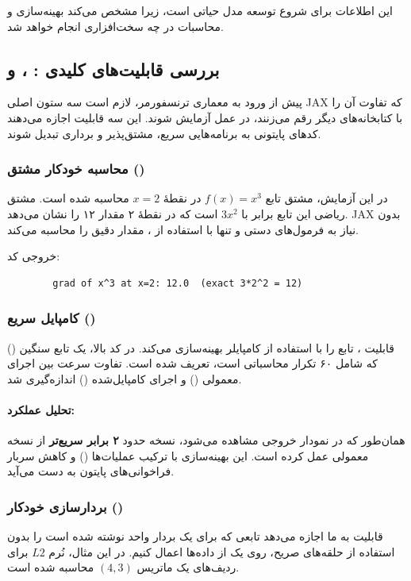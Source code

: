\documentclass{article}
\begin{document}
این اطلاعات برای شروع توسعه مدل حیاتی است، زیرا مشخص می‌کند بهینه‌سازی و محاسبات در چه سخت‌افزاری انجام خواهد شد.

\subsection{بررسی قابلیت‌های کلیدی : ،  و }

پیش از ورود به معماری ترنسفورمر، لازم است سه ستون اصلی JAX که تفاوت آن را با کتابخانه‌های دیگر رقم می‌زنند، در عمل آزمایش شوند. این سه قابلیت اجازه می‌دهند کدهای پایتونی به برنامه‌هایی سریع، مشتق‌پذیر و برداری تبدیل شوند.

\subsubsection*{محاسبه خودکار مشتق ()}
در این آزمایش، مشتق تابع $f(x) = x^3$ در نقطۀ $x=2$ محاسبه شده است. مشتق ریاضی این تابع برابر با $3x^2$ است که در نقطۀ ۲ مقدار ۱۲ را نشان می‌دهد. JAX بدون نیاز به فرمول‌های دستی و تنها با استفاده از ، مقدار دقیق را محاسبه می‌کند.

خروجی کد:

\begin{latin}
	\begin{verbatim}
		grad of x^3 at x=2: 12.0  (exact 3*2^2 = 12)
	\end{verbatim}
\end{latin}


\subsubsection*{کامپایل سریع ()}
قابلیت ، تابع را با استفاده از کامپایلر  بهینه‌سازی می‌کند. در کد بالا، یک تابع سنگین () که شامل ۶۰ تکرار محاسباتی است، تعریف شده است. تفاوت سرعت بین اجرای معمولی () و اجرای کامپایل‌شده () اندازه‌گیری شد.

\paragraph{تحلیل عملکرد:} همان‌طور که در نمودار خروجی مشاهده می‌شود، نسخه  حدود \textbf{۲ برابر سریع‌تر} از نسخه معمولی عمل کرده است. این بهینه‌سازی با ترکیب عملیات‌ها () و کاهش سربار فراخوانی‌های پایتون به دست می‌آید.

\subsubsection*{بردارسازی خودکار ()}
قابلیت  به ما اجازه می‌دهد تابعی که برای یک بردار واحد نوشته شده است را بدون استفاده از حلقه‌های  صریح، روی یک  از داده‌ها اعمال کنیم. در این مثال، نُرم $L2$ برای ردیف‌های یک ماتریس $(4,3)$ محاسبه شده است.
\end{document}
